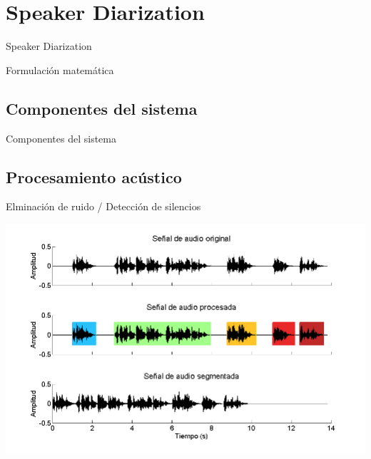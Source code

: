 
\section{Speaker Diarization}

\begin{frame}{Speaker Diarization}

\end{frame}

\begin{frame}{Formulación matemática}

\end{frame}

\subsection{Componentes del sistema}
\begin{frame}{Componentes del sistema}{}

\end{frame}

\subsection{Procesamiento acústico}

\begin{frame}{Elminación de ruido / Detección de silencios}
  \begin{center}
    \includegraphics[width=1\textwidth]{gfx/f-silence}
  \end{center}
\end{frame}



